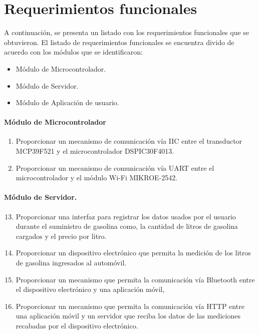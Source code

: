 \section{Requerimientos funcionales}
A continuación, se presenta un listado con los requerimientos funcionales que se obtuvieron.
El listado de requerimientos funcionales se encuentra divido de acuerdo con los módulos que se identificaron:
\begin{itemize}
	\item Módulo de Microcontrolador.
	\item Módulo de Servidor.
	\item Módulo de Aplicación de usuario.
\end{itemize}

\paragraph{Módulo de Microcontrolador}
\begin{enumerate}[label=RF\arabic*.]
	\item Proporcionar un mecanismo de comunicación vía IIC entre el transductor MCP39F521 y el microcontrolador DSPIC30F4013.
	\item Proporcionar un mecanismo de comunicación vía UART entre el microcontrolador y el módulo Wi-Fi MIKROE-2542.
\end{enumerate}

\paragraph{Módulo de Servidor.}
\begin{enumerate}[label=RF\arabic*.]
	\setcounter{enumi}{12}
	\item Proporcionar una interfaz para registrar los datos usados por el usuario durante el suministro de gasolina como, la cantidad de litros de gasolina cargados y el precio por litro.
	\item Proporcionar un dispositivo electrónico que permita la medición de los litros de gasolina ingresados al automóvil.
	\item Proporcionar un mecanismo que permita la comunicación vía Bluetooth entre el dispositivo electrónico y una aplicación móvil,
	\item Proporcionar un mecanismo que permita la comunicación vía HTTP entre una aplicación móvil y un servidor que reciba los datos de las mediciones recabadas por el dispositivo electrónico.
\end{enumerate}

